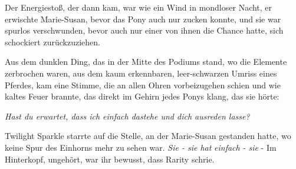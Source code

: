 Der Energiestoß, der dann kam, war wie ein Wind in mondloser Nacht, er erwischte Marie-Susan, bevor das Pony auch nur zucken konnte, und sie war spurlos verschwunden, bevor auch nur einer von ihnen die Chance hatte, sich schockiert zurückzuziehen.

Aus dem dunklen Ding, das in der Mitte des Podiums stand, wo die Elemente zerbrochen waren, aus dem kaum erkennbaren, leer-schwarzen Umriss eines Pferdes, kam eine Stimme, die an allen Ohren vorbeizugehen schien und wie kaltes Feuer brannte, das direkt im Gehirn jedes Ponys klang, das sie hörte:

\emph{Hast du erwartet, dass ich einfach dastehe und dich ausreden lasse?}

Twilight Sparkle starrte auf die Stelle, an der Marie-Susan gestanden hatte, wo keine Spur des Einhorns mehr zu sehen war. \emph{Sie - sie hat} \emph{einfach} \emph{- sie} - Im Hinterkopf, ungehört, war ihr bewusst, dass Rarity schrie.

